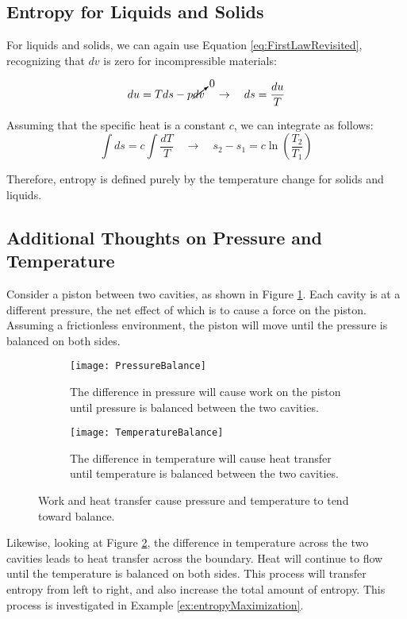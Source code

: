 \subsection{Entropy for Liquids and Solids}
For liquids and solids, we can again use Equation \ref{eq:FirstLawRevisited}, recognizing that $dv$ is zero for incompressible materials:

\begin{equation*}
  du = Tds - p\cancelto{0}{dv} \quad\rightarrow\quad ds = \frac{du}{T}
\end{equation*}

Assuming that the specific heat is a constant $c$, we can integrate as follows:
\begin{equation} \label{eq:entropyChangeIncompressible}
  \int ds = c\int\frac{dT}{T} \quad\rightarrow\quad s_2 - s_1 = c \ln \left(
 \frac{T_2}{T_1}\right)
\end{equation}

Therefore, entropy is defined purely by the temperature change for solids and liquids.

\subsection{Additional Thoughts on Pressure and Temperature}
Consider a piston between two cavities, as shown in Figure \ref{fig:doublePistonWork}.  Each cavity is at a different pressure, the net effect of which is to cause a force on the piston.  Assuming a frictionless environment, the piston will move until the pressure is balanced on both sides.
\begin{figure}[H]
\centering
\begin{subfigure}{.45\textwidth}
  \centering
  \texttt{[image: PressureBalance]}
  \caption{The difference in pressure will cause work on the piston until pressure is balanced between the two cavities.}
  \label{fig:doublePistonWork}
\end{subfigure}%
\hfill
\begin{subfigure}{.45\textwidth}
  \centering
  \texttt{[image: TemperatureBalance]}
  \caption{The difference in temperature will cause heat transfer until temperature is balanced between the two cavities.}
  \label{fig:doubleCavityHeatTransfer}
\end{subfigure}
\caption{Work and heat transfer cause pressure and temperature to tend toward balance.}
\label{fig:statMechPressureAndTemp}
\end{figure}
Likewise, looking at Figure \ref{fig:doubleCavityHeatTransfer}, the difference in temperature across the two cavities leads to heat transfer across the boundary.  Heat will continue to flow until the temperature is balanced on both sides.  This process will transfer entropy from left to right, and also increase the total amount of entropy.  This process is investigated in Example \ref{ex:entropyMaximization}.

